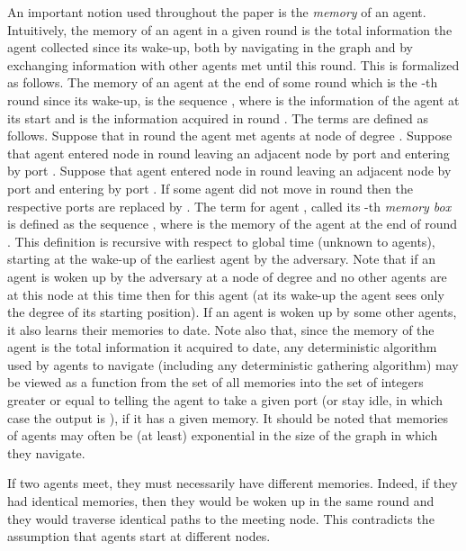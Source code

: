 \documentclass[11pt]{article}
\begin{document}
 An important notion used throughout the paper is the {\em memory} of an agent. 
 Intuitively, the memory of an agent in a given round is the total information the agent collected since its wake-up,
 both by navigating in the graph and by exchanging information with other agents met until this round. This is formalized as follows. The memory of an agent  at
 the end of some round which is  the -th round since its wake-up, is the sequence , where  is the information of the agent at its start
 and  is the information acquired in round . The terms  are defined as follows. Suppose that in round  the agent  met agents  at node  of degree . Suppose that agent  entered node  in round  leaving an adjacent node  by port  and entering  by port . 
 Suppose that agent  entered node  in round  leaving an adjacent node  by port  and entering  by port . If some agent did not move in
 round  then the respective ports are replaced by . The term  for agent , called its -th {\em memory box} is defined as the sequence
 , where  is the memory of the agent  at the end of round . This definition is recursive with respect to 
  global time (unknown to agents), starting at the wake-up of the earliest agent by the adversary. Note that if an agent is woken up by the adversary 
  at a node of degree  and no other agents are at this node at this time then {} for this agent (at its wake-up the agent sees only the degree of its
  starting position). If an agent is woken up by some other agents, it also learns their memories to date. Note also that, since the memory of the agent is the total  
  information it acquired to date, any deterministic algorithm used by agents to navigate (including any deterministic gathering algorithm) may be viewed as a function
  from the set of all memories into  the set of integers greater or equal to  telling the agent to take a given port  
  (or stay idle, in which case the output is ), if it has a given memory. It should be noted that memories of agents may often be (at least) exponential in the size of the graph in which they navigate.
  
  If two agents meet, they must necessarily have different memories. Indeed, if they had identical memories, then they would be woken up in the same round
  and they would traverse identical paths to the meeting node. This contradicts the assumption that agents start at different nodes.
\end{document}

